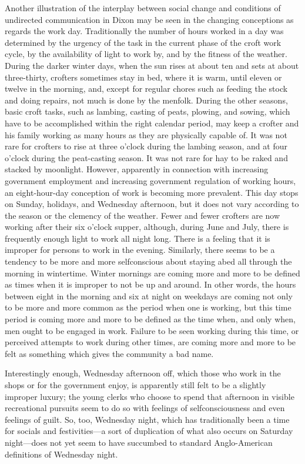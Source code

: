 \documentclass[twoside,symmetric,nobib,justified]{tufte-book}
\begin{document}
Another illustration of the interplay between social change and
conditions of undirected communication in Dixon may be seen in the
changing conceptions as regards the work day. Traditionally the number
of hours worked in a day was determined by the urgency of the task in
the current phase of the croft work cycle, by the availability of light
to work by, and by the fitness of the weather. During the darker winter
days, when the sun rises at about ten and sets at about three-thirty,
crofters sometimes stay in bed, where it is warm, until eleven or twelve
in the morning, and, except for regular chores such as feeding the stock
and doing repairs, not much is done by the menfolk. During the other
seasons, basic croft tasks, such as lambing, casting of peats, plowing,
and sowing, which have to be accomplished within the right calendar
period, may keep a crofter and his family working as many hours as they
are physically capable of. It was not rare for crofters to rise at three
o'clock during the lambing season, and at four o'clock during the
peat-casting season. It was not rare for hay to be raked and stacked by
moonlight. However, apparently in connection with increasing government
employment and increasing government regulation of working hours, an
eight-hour-day conception of work is becoming more prevalent. This day
stops on Sunday, holidays, and Wednesday afternoon, but it does not vary
according to the season or the clemency of the weather. Fewer and fewer
crofters are now working after their six o'clock supper, although,
during June and July, there is frequently enough light to work all night
long. There is a feeling that it is improper for persons to work in the
evening. Similarly, there seems to be a tendency to be more and more
selfconscious about staying abed all through the morning in wintertime.
Winter mornings are coming more and more to be defined as times when it
is improper to not be up and around. In other words, the hours between
eight in the morning and six at night on weekdays are coming not only to
be more and more common as the period when one is working, but this time
period is coming more and more to be defined as the time when, and only
when, men ought to be engaged in work. Failure to be seen working during
this time, or perceived attempts to work during other times, are coming
more and more to be felt as something which gives the community a bad
name.

\enlargethispage{\baselineskip}

Interestingly enough, Wednesday afternoon off, which those who work in
the shops or for the government enjoy, is apparently still felt to be a
slightly improper luxury; the young clerks who choose to spend that
afternoon in visible recreational pursuits seem to do so with feelings
of selfconsciousness and even feelings of guilt. So, too, Wednesday
night, which has traditionally been a time for socials and
festivities---a sort of duplication of what also occurs on Saturday
night---does not yet seem to have succumbed to standard Anglo-American
definitions of Wednesday night.
\end{document}
